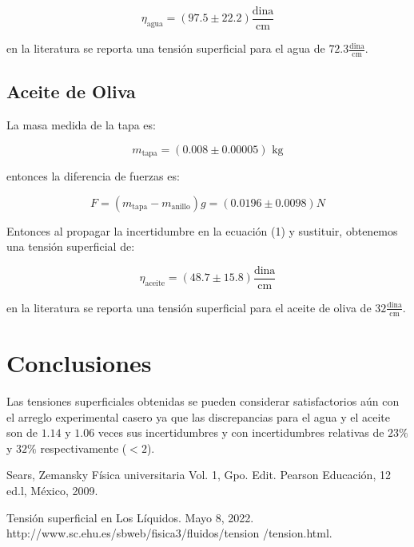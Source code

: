 \documentclass[DIV=calc, paper=a4, fontsize=11pt]{scrartcl}
\begin{document}
\begin{multicols}{2}
\begin{equation*}
    \eta_{\text{agua}} = (97.5 \pm 22.2) \frac{\text{dina}}{\text{cm}}  
\end{equation*}

en la literatura se reporta una tensión superficial para el agua de $72.3 \frac{\text{dina}}{\text{cm}}$.
\subsection*{Aceite de Oliva}

La masa medida de la tapa es:

\begin{equation*}
     m_{\text{tapa}} = (0.008 \pm 0.00005) \text{ kg} 
\end{equation*}

entonces la diferencia de fuerzas es:

\begin{equation*}
    F= (m_{\text{tapa}} - m_{\text{anillo}})g = (0.0196 \pm 0.0098) N
\end{equation*}

Entonces al propagar la incertidumbre en la ecuación (1) y sustituir, obtenemos una tensión superficial de:


\begin{equation*}
    \eta_{\text{aceite}} = (48.7 \pm 15.8) \frac{\text{dina}}{\text{cm}}  
\end{equation*}

en la literatura se reporta una tensión superficial para el aceite de oliva de $32 \frac{\text{dina}}{\text{cm}}$.

\section*{Conclusiones}

Las tensiones superficiales obtenidas se pueden considerar satisfactorios aún con el arreglo experimental casero ya que las discrepancias para el agua y el aceite son de $1.14$ y $1.06$ veces sus incertidumbres y con incertidumbres relativas de $23\%$ y $32\%$ respectivamente ($<2$).
  
\begin{thebibliography}{99}
 Sears, Zemansky Física universitaria Vol. 1, Gpo.
Edit. Pearson Educación, 12 ed.l, México, 2009.


 Tensión superficial en Los Líquidos. Mayo 8, 2022. http://www.sc.ehu.es/sbweb/fisica3/fluidos/tension
/tension.html.
\end{thebibliography}



\end{multicols}
\newpage
\end{document}
